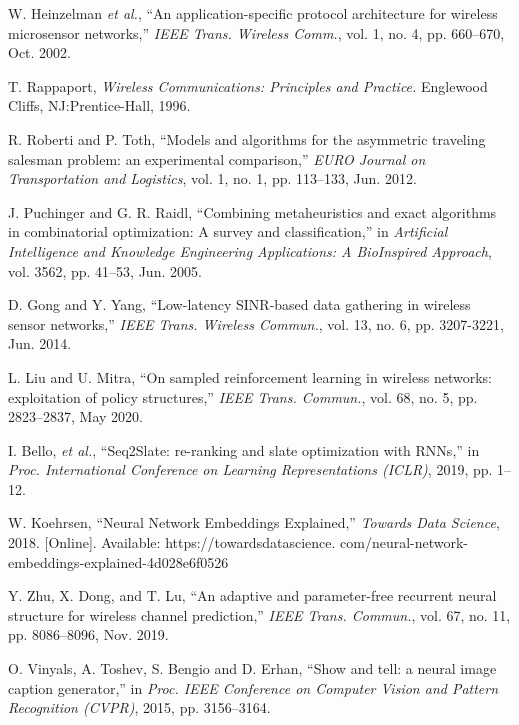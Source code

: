 \documentclass[journal]{IEEEtran}
\begin{document}
\begin{thebibliography}{1}
		


		 W. Heinzelman \emph{et al.}, ``An application-specific protocol architecture for wireless microsensor networks,'' \emph{IEEE Trans. Wireless Comm.}, vol. 1, no. 4, pp. 660--670, Oct. 2002.
		
		 T. Rappaport, \emph{Wireless Communications: Principles and Practice.} Englewood Cliffs, NJ:Prentice-Hall, 1996.
		
	
		
		 R. Roberti and P. Toth, ``Models and algorithms for the asymmetric traveling salesman problem: an experimental comparison,'' \emph{EURO Journal on Transportation and Logistics}, vol. 1, no. 1, pp. 113--133, Jun. 2012.
	
		
		 J. Puchinger and G. R. Raidl, ``Combining metaheuristics and exact algorithms in combinatorial optimization: A survey and classification,''  in \emph{Artificial Intelligence and Knowledge Engineering Applications: A BioInspired Approach}, vol. 3562, pp. 41--53, Jun. 2005.
		

         D. Gong and Y. Yang, ``Low-latency SINR-based data gathering in wireless sensor networks,''  \emph{IEEE Trans. Wireless Commun.},  vol. 13, no. 6, pp. 3207-3221, Jun. 2014.

	
		 L. Liu and U. Mitra, ``On sampled reinforcement learning in wireless networks: exploitation of policy structures,'' \emph{IEEE Trans. Commun.}, vol. 68, no. 5, pp. 2823--2837, May 2020.
		
		

         I. Bello, \emph{et al.}, ``Seq2Slate: re-ranking and slate optimization with RNNs,'' in \emph{Proc. International Conference on Learning Representations (ICLR)}, 2019, pp. 1--12.



          W. Koehrsen, ``Neural Network Embeddings Explained,'' \emph{Towards Data Science}, 2018. [Online]. Available: https://towardsdatascience. com/neural-network-embeddings-explained-4d028e6f0526

         Y. Zhu, X. Dong, and T. Lu, ``An adaptive and parameter-free recurrent neural structure for wireless channel prediction,'' \emph{IEEE Trans. Commun.}, vol. 67, no. 11, pp. 8086--8096, Nov. 2019.



         O. Vinyals, A. Toshev, S. Bengio and D. Erhan, ``Show and tell: a neural image caption generator,'' in \emph{Proc. IEEE Conference on Computer Vision and Pattern Recognition (CVPR)}, 2015, pp. 3156--3164.




\end{thebibliography}
\end{document}

